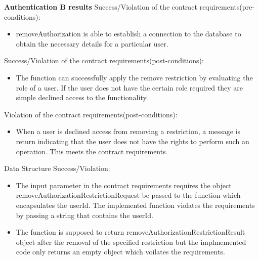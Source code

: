 \noindent
\textbf{Authentication B results}\newline
Success/Violation of the contract requirements(pre-conditions):
\begin{itemize}
	\item removeAuthorization is able to establish a connection to the database to obtain the necessary details for a particular user.
\end{itemize}

\noindent
Success/Violation of the contract requirements(post-conditions):
\begin{itemize}
	\item The function can successfully apply the remove restriction by evaluating the role of a user. If the user does not have the certain role required they are simple declined access to the functionality.
\end{itemize} 

\noindent
Violation of the contract requirements(post-conditions):
\begin{itemize}
	\item When a user is declined access from removing a restriction, a message is return indicating that the user does not have the rights to perform such an operation. This meets the contract requirements.
\end{itemize}

\noindent
Data Structure Success/Violation:
\begin{itemize}
	\item The input parameter in the contract requirements requires the object removeAuthorizationRestrictionRequest be passed to the function which encapsulates the userId. The implemented function violates the requirements by passing a string that contains the userId.
	\item The function is supposed to return removeAuthorizationRestrictionResult object after the removal of the specified restriction but the implmemented code only returns an empty object which voilates the requirements.
\end{itemize} 











